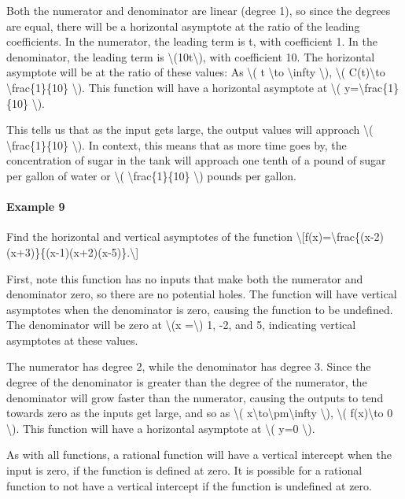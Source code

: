 Both the numerator and denominator are linear (degree 1), so since the
degrees are equal, there will be a horizontal asymptote at the ratio of
the leading coefficients. In the numerator, the leading term is t, with
coefficient 1. In the denominator, the leading term is
\textbackslash{}(10t\textbackslash{}), with coefficient 10. The
horizontal asymptote will be at the ratio of these values: As
\textbackslash{}( t \textbackslash{}to \textbackslash{}infty
\textbackslash{}), \textbackslash{}( C(t)\textbackslash{}to
\textbackslash{}frac\{1\}\{10\} \textbackslash{}). This function will
have a horizontal asymptote at \textbackslash{}(
y=\textbackslash{}frac\{1\}\{10\} \textbackslash{}).

This tells us that as the input gets large, the output values will
approach \textbackslash{}( \textbackslash{}frac\{1\}\{10\}
\textbackslash{}). In context, this means that as more time goes by, the
concentration of sugar in the tank will approach one tenth of a pound of
sugar per gallon of water or \textbackslash{}(
\textbackslash{}frac\{1\}\{10\} \textbackslash{}) pounds per gallon.

\hypertarget{example-9}{%
\paragraph{Example 9}\label{example-9}}

Find the horizontal and vertical asymptotes of the function
\textbackslash{}{[}f(x)=\textbackslash{}frac\{(x-2)(x+3)\}\{(x-1)(x+2)(x-5)\}.\textbackslash{}{]}

First, note this function has no inputs that make both the numerator and
denominator zero, so there are no potential holes. The function will
have vertical asymptotes when the denominator is zero, causing the
function to be undefined. The denominator will be zero at
\textbackslash{}(x =\textbackslash{}) 1, -2, and 5, indicating vertical
asymptotes at these values.

The numerator has degree 2, while the denominator has degree 3. Since
the degree of the denominator is greater than the degree of the
numerator, the denominator will grow faster than the numerator, causing
the outputs to tend towards zero as the inputs get large, and so as
\textbackslash{}(
x\textbackslash{}to\textbackslash{}pm\textbackslash{}infty
\textbackslash{}), \textbackslash{}( f(x)\textbackslash{}to 0
\textbackslash{}). This function will have a horizontal asymptote at
\textbackslash{}( y=0 \textbackslash{}).

As with all functions, a rational function will have a vertical
intercept when the input is zero, if the function is defined at zero. It
is possible for a rational function to not have a vertical intercept if
the function is undefined at zero.

